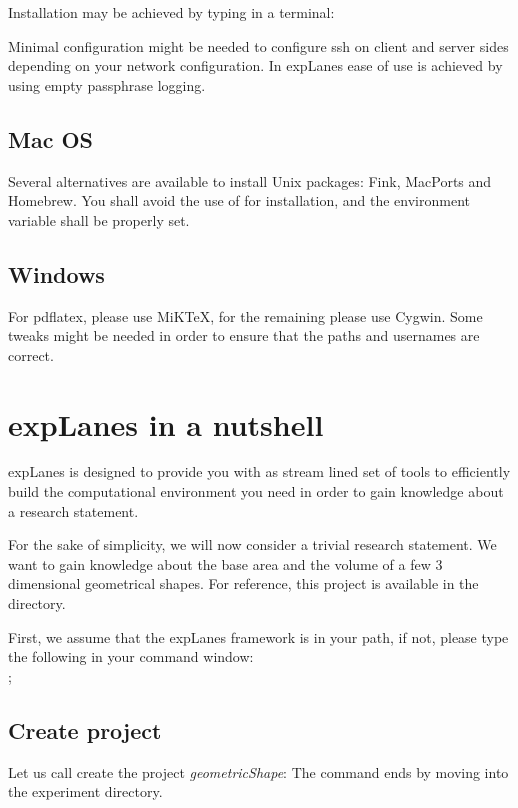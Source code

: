 \documentclass[a4paper,fleqn]{tufte-handout}
\newcommand{\explanes}{\textsf{expLanes} }
\begin{document}
Installation may be achieved by typing in a terminal: 


Minimal configuration might be needed to configure ssh on client and server sides depending on your network configuration. In \explanes ease of use is achieved by using empty passphrase logging.

\subsection{Mac OS}

Several alternatives are available to install Unix packages: Fink, MacPorts and Homebrew. You shall avoid the use of  for installation, and the  environment variable shall be properly set.

\subsection{Windows}

For pdflatex, please use MiKTeX, for the remaining please use Cygwin. Some tweaks might be needed in order to ensure that the paths and usernames are correct.

\section{\explanes in a nutshell}

\explanes is designed to provide you with as stream lined set of tools to efficiently build the computational environment you need in order to gain knowledge about a research statement.

For the sake of simplicity, we will now consider a trivial research statement. We want to gain knowledge about the base area and the volume of a few 3 dimensional geometrical shapes. For reference, this project is available in the  directory. %

First, we assume that the \explanes framework is in your path, if not, please type the following in your command window: \\ ;

\subsection{Create project}

Let us call create the project \textsl{geometricShape}:
The command ends by moving into the experiment directory.
\end{document}
